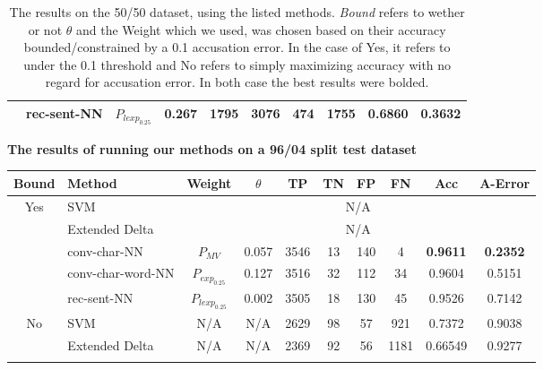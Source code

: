 \begin{table}[]
\begin{tabular}{|c|l|c|c|c|c|c|c|c|c|}
                     & \gls{rec-sent-NN}       & $P_{lexp_{0.25}}$ & 0.267    & 1795 & 3076 & 474  & 1755 & 0.6860          & 0.3632          \\ \hline
\end{tabular}
\caption{The results on the 50/50 dataset, using the listed methods.
\textit{Bound} refers to wether or not $\theta$ and the Weight which we used,
was chosen based on their accuracy bounded/constrained by a 0.1 accusation error.
In the case of Yes, it refers to under the 0.1 threshold and No refers to simply
maximizing accuracy with no regard for accusation error. In both case
the best results were bolded.}
\label{tab:50_results}
\end{table}

\begin{table}[]
\centering
\textbf{The results of running our methods on a 96/04 split test dataset}\par\medskip
\begin{tabular}{|c|l|c|c|c|c|c|c|c|c|}
\hline
Bound                & Method                  & Weight            & $\theta$ & TP  & TN & FP & FN  & Acc             & A-Error         \\ \hline
\multirow{5}{*}{Yes} & SVM                     & \multicolumn{8}{c|}{N/A}                                                                   \\ \cline{2-10} 
                     & Extended Delta          & \multicolumn{8}{c|}{N/A}                                                                   \\ \cline{2-10} 
                     & \gls{conv-char-NN}      & $P_{MV}$          & 0.057    & 3546 & 13  & 140 & 4    & \textbf{0.9611} & \textbf{0.2352} \\ \cline{2-10} 
                     & \gls{conv-char-word-NN} & $P_{exp_{0.25}}$  & 0.127    & 3516 & 32  & 112 & 34   & 0.9604          & 0.5151          \\ \cline{2-10} 
                     & \gls{rec-sent-NN}       & $P_{lexp_{0.25}}$ & 0.002    & 3505 & 18  & 130 & 45   & 0.9526          & 0.7142          \\ \hline\hline
\multirow{5}{*}{No}  & SVM                     & N/A               & N/A      & 2629 & 98  & 57  & 921  & 0.7372          & 0.9038          \\ \cline{2-10} 
                     & Extended Delta          & N/A               & N/A      & 2369 & 92  & 56  & 1181 & 0.66549         & 0.9277          \\ \cline{2-10} 

\end{tabular}
\end{table}
